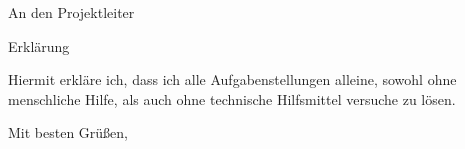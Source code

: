 \documentclass{letter}
\begin{document}
 \begin{letter}{An den Projektleiter}
  \opening{Erklärung}
   Hiermit erkläre ich, dass ich alle Aufgabenstellungen alleine,
   sowohl ohne menschliche Hilfe, als auch ohne technische Hilfsmittel
   versuche zu lösen.
  \closing{Mit besten Grüßen,}
 \end{letter}
\end{document}
